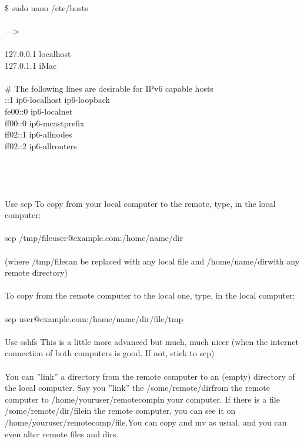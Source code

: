\documentclass[10pt,a4paper]{article}
\begin{document}
{{{{{{{{{{{{{{{{{{{{{{\\
\$ sudo nano /etc/hosts}{\large \\
\\
--->\\
\\
	127.0.0.1       localhost\\
	127.0.1.1       iMac\\
\\
	\# The following lines are desirable for IPv6 capable hosts\\
	::1     ip6-localhost ip6-loopback\\
	fe00::0 ip6-localnet\\
	ff00::0 ip6-mcastprefix\\
	ff02::1 ip6-allnodes\\
	ff02::2 ip6-allrouters\\
\\
\\
\\
\\
Use scp To copy from your local computer to the remote, type, in the local computer:\\
\\
scp /tmp/file}{\large user@example.com:/home/name/dir}{\large \\
\\
(where /tmp/file}{\large  can be replaced with any local file and /home/name/dir}{\large  with any remote directory)\\
\\
To copy from the remote computer to the local one, type, in the local computer:\\
\\
scp user@example.com:/home/name/dir/file}{\large  /tmp\\
\\
Use sshfs This is a little more advanced but much, much nicer (when the internet connection of both computers is good. If not, stick to scp)\\
\\
You can ''link'' a directory from the remote computer to an (empty) directory of the local computer. Say you ''link'' the /some/remote/dir}{\large  from the remote computer to /home/youruser/remotecomp}{\large  in your computer. If there is a file /some/remote/dir/file}{\large  in the remote computer, you can see it on /home/youruser/remotecomp/file.}{\large  You can copy and mv as usual, and you can even alter remote files and dirs.\\
\\
}}}}}}}}}}}}}}}}}}}}}}
\end{document}
